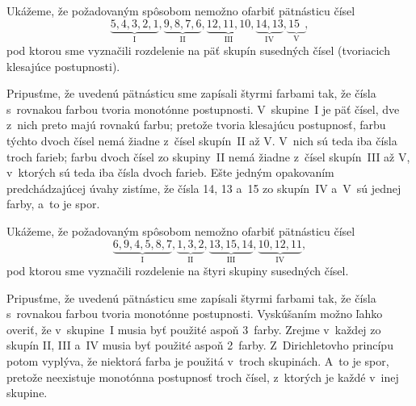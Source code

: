 {%
Ukážeme, že požadovaným spôsobom nemožno ofarbiť
pätnásticu čísel
$$
\underbrace{5,4,3,2,1}_{\text{I}},
\underbrace{9,8,7,6}_{\text{II}},
\underbrace{12,11,10}_{\text{III}},
\underbrace{14,13}_{\text{IV}},
\underbrace{15\phantom{,}}_{\text{V}},
$$
pod ktorou sme vyznačili rozdelenie na päť skupín susedných čísel
(tvoriacich klesajúce postupnosti).

Pripusťme, že uvedenú pätnásticu sme zapísali štyrmi farbami tak,
že čísla s~rovnakou farbou tvoria monotónne postupnosti. V~skupine~I
je päť čísel, dve z~nich preto majú rovnakú farbu;
pretože tvoria klesajúcu postupnosť, farbu týchto dvoch čísel
nemá žiadne z~čísel skupín~II až V. V~nich sú teda iba čísla
troch farieb; farbu dvoch čísel zo skupiny~II nemá žiadne z~čísel
skupín~III až V, v~ktorých sú teda iba čísla dvoch farieb.
Ešte jedným opakovaním predchádzajúcej úvahy zistíme, že čísla 14, 13
a~15 zo skupín~IV a~V~sú jednej farby, a~to je spor.

\ineriesenie
Ukážeme, že požadovaným spôsobom nemožno ofarbiť
pätnásticu čísel
$$
\underbrace{6,9,4,5,8,7}_{\text{I}},
\underbrace{1,3,2}_{\text{II}},
\underbrace{13,15,14}_{\text{III}},
\underbrace{10,12,11}_{\text{IV}},
$$
pod ktorou sme vyznačili rozdelenie na štyri skupiny susedných čísel.

Pripusťme, že uvedenú pätnásticu sme zapísali štyrmi farbami tak,
že čísla s~rovnakou farbou tvoria monotónne postupnosti. 
Vyskúšaním možno ľahko overiť, že v~skupine~I musia byť použité aspoň 3~farby. Zrejme v~každej
zo skupín II, III a~IV musia byť použité aspoň 2~farby. Z~Dirichletovho princípu potom vyplýva,
že niektorá farba je použitá v~troch skupinách. A~to je spor, pretože neexistuje monotónna
postupnosť troch čísel, z~ktorých je každé v~inej skupine.}

